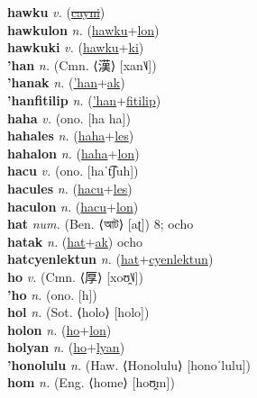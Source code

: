 \textbf{hawku} \textit{v.} (\hyperref[cayni]{\sout{cayni}})
 \label{hawku} \\
\textbf{hawkulon} \textit{n.} (\hyperref[hawku]{hawku}+\hyperref[lon]{lon})
 \label{hawkulon} \\
\textbf{hawkuki} \textit{v.} (\hyperref[hawku]{hawku}+\hyperref[ki]{ki})
 \label{hawkuki} \\
\textbf{'han} \textit{n.} (Cmn. ⟨漢⟩ [xan˥˩])
 \label{'han} \\
\textbf{'hanak} \textit{n.} (\hyperref['han]{'han}+\hyperref[ak]{ak})
 \label{'hanak} \\
\textbf{'hanfitilip} \textit{n.} (\hyperref['han]{'han}+\hyperref[fitilip]{fitilip})
 \label{'hanfitilip} \\
\textbf{haha} \textit{v.} (ono. [ha ha])
 \label{haha} \\
\textbf{hahales} \textit{n.} (\hyperref[haha]{haha}+\hyperref[les]{les})
 \label{hahales} \\
\textbf{hahalon} \textit{n.} (\hyperref[haha]{haha}+\hyperref[lon]{lon})
 \label{hahalon} \\
\textbf{hacu} \textit{v.} (ono. [haˈt͡ʃuh])
 \label{hacu} \\
\textbf{hacules} \textit{n.} (\hyperref[hacu]{hacu}+\hyperref[les]{les})
 \label{hacules} \\
\textbf{haculon} \textit{n.} (\hyperref[hacu]{hacu}+\hyperref[lon]{lon})
 \label{haculon} \\
\textbf{hat} \textit{num.} (Ben. ⟨আট⟩ [aʈ])
8; ocho \label{hat} \\
\textbf{hatak} \textit{n.} (\hyperref[hat]{hat}+\hyperref[ak]{ak})
ocho \label{hatak} \\
\textbf{hatcyenlektun} \textit{n.} (\hyperref[hat]{hat}+\hyperref[cyenlektun]{cyenlektun})
 \label{hatcyenlektun} \\
\textbf{ho} \textit{v.} (Cmn. ⟨厚⟩ [xoʊ̯˥˩])
 \label{ho} \\
\textbf{'ho} \textit{n.} (ono. [h])
 \label{'ho} \\
\textbf{hol} \textit{n.} (Sot. ⟨holo⟩ [holo])
 \label{hol} \\
\textbf{holon} \textit{n.} (\hyperref[ho]{ho}+\hyperref[lon]{lon})
 \label{holon} \\
\textbf{holyan} \textit{n.} (\hyperref[ho]{ho}+\hyperref[lyan]{lyan})
 \label{holyan} \\
\textbf{'honolulu} \textit{n.} (Haw. ⟨Honolulu⟩ [honoˈlulu])
 \label{'honolulu} \\
\textbf{hom} \textit{n.} (Eng. ⟨home⟩ [hoʊ̯m])
